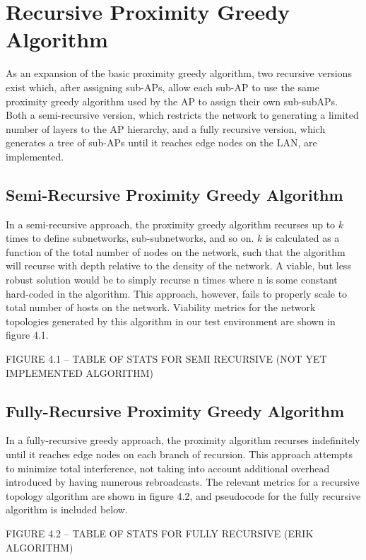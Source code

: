 \documentclass{sigcomm-alternate}
\begin{document}
\section{Recursive Proximity Greedy Algorithm}
As an expansion of the basic proximity greedy algorithm, two recursive versions exist which, after assigning sub-APs, allow each sub-AP to use the same proximity greedy algorithm used by the AP to assign their own sub-subAPs. Both a semi-recursive version, which restricts the network to generating a limited number of layers to the AP hierarchy, and a fully recursive version, which generates a tree of sub-APs until it reaches edge nodes on the LAN, are implemented.

\subsection{Semi-Recursive Proximity Greedy Algorithm}
In a semi-recursive approach, the proximity greedy algorithm recurses up to $k$ times to define subnetworks, sub-subnetworks, and so on. $k$ is calculated as a function of the total number of nodes on the network, such that the algorithm will recurse with depth relative to the density of the network. A viable, but less robust solution would be to simply recurse n times where n is some constant hard-coded in the algorithm. This approach, however, fails to properly scale to total number of hosts on the network. Viability metrics for the network topologies generated by this algorithm in our test environment are shown in figure 4.1.

FIGURE 4.1 -- TABLE OF STATS FOR SEMI RECURSIVE (NOT YET IMPLEMENTED ALGORITHM)

\subsection{Fully-Recursive Proximity Greedy Algorithm}
In a fully-recursive greedy approach, the proximity algorithm recurses indefinitely until it reaches edge nodes on each branch of recursion. This approach attempts to minimize total interference, not taking into account additional overhead introduced by having numerous rebroadcasts. The relevant metrics for a recursive topology algorithm are shown in figure 4.2, and pseudocode for the fully recursive algorithm is included below.

FIGURE 4.2 -- TABLE OF STATS FOR FULLY RECURSIVE (ERIK ALGORITHM)
\end{document}
